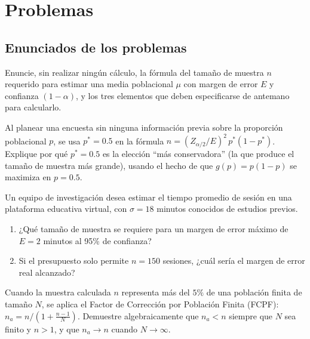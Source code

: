 \section*{Problemas}

\subsection*{Enunciados de los problemas}

\begin{problema}
	\label{prob:01c5fc7}
	Enuncie, sin realizar ningún cálculo, la fórmula del tamaño de muestra $n$ requerido para estimar una media poblacional $\mu$ con margen de error $E$ y confianza $(1-\alpha)$, y los tres elementos que deben especificarse de antemano para calcularlo.
\end{problema}

\begin{problema}
	\label{prob:f82cc83}
	Al planear una encuesta sin ninguna información previa sobre la proporción poblacional $p$, se usa $p^*=0.5$ en la fórmula $n=(Z_{\alpha/2}/E)^2\,p^*(1-p^*)$. Explique por qué $p^*=0.5$ es la elección ``más conservadora'' (la que produce el tamaño de muestra más grande), usando el hecho de que $g(p)=p(1-p)$ se maximiza en $p=0.5$.
\end{problema}

\begin{problema}
	\label{prob:f57d73c}
	Un equipo de investigación desea estimar el tiempo promedio de sesión en una plataforma educativa virtual, con $\sigma=18$ minutos conocidos de estudios previos.
	\begin{enumerate}
		\item ¿Qué tamaño de muestra se requiere para un margen de error máximo de $E=2$ minutos al 95\% de confianza?
		\item Si el presupuesto solo permite $n=150$ sesiones, ¿cuál sería el margen de error real alcanzado?
	\end{enumerate}
\end{problema}

\begin{problema}
	\label{prob:2e73754}
	Cuando la muestra calculada $n$ representa más del $5\%$ de una población finita de tamaño $N$, se aplica el Factor de Corrección por Población Finita (FCPF): $n_a = n/(1+\frac{n-1}{N})$. Demuestre algebraicamente que $n_a < n$ siempre que $N$ sea finito y $n>1$, y que $n_a \to n$ cuando $N\to\infty$.
\end{problema}

